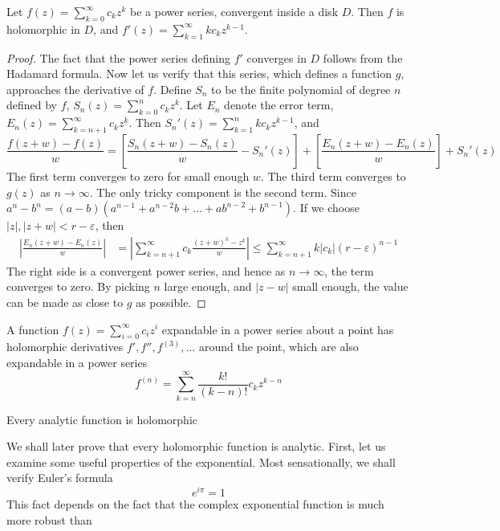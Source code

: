 \begin{theorem}
    Let $f(z) = \sum_{k = 0}^\infty c_k z^k$ be a power series, convergent inside a disk $D$. Then $f$ is holomorphic in $D$, and $f'(z) = \sum_{k = 1}^\infty k c_k z^{k-1}$.
\end{theorem}
\begin{proof}
    The fact that the power series defining $f'$ converges in $D$ follows from the Hadamard formula. Now let us verify that this series, which defines a function $g$, approaches the derivative of $f$. Define $S_n$ to be the finite polynomial of degree $n$ defined by $f$, $S_n(z) = \sum_{k = 0}^n c_k z^k$. Let $E_n$ denote the error term, $E_n(z) = \sum_{k = n+1}^\infty c_k z^k$. Then $S_n'(z) = \sum_{k = 1}^n k c_k z^{k-1}$, and
    \[ \frac{f(z + w) - f(z)}{w} = \left[ \frac{S_n(z + w) - S_n(z)}{w} - S_n'(z) \right] + \left[ \frac{E_n(z + w) - E_n(z)}{w} \right] + S_n'(z) \]
    The first term converges to zero for small enough $w$. The third term converges to $g(z)$ as $n \to \infty$. The only tricky component is the second term. Since $a^n - b^n = (a - b)(a^{n-1} + a^{n-2}b + \dots + ab^{n-2} + b^{n-1})$. If we choose $|z|, |z + w| < r - \varepsilon$, then
    \begin{align*}
        \left| \frac{E_n(z + w) - E_n(z)}{w} \right| &= \left| \sum_{k = n + 1}^\infty c_k \frac{(z + w)^k - z^k}{w} \right| \leq \sum_{k = n + 1}^\infty k |c_k| (r - \varepsilon)^{n-1}
    \end{align*}
    The right side is a convergent power series, and hence as $n \to \infty$, the term converges to zero. By picking $n$ large enough, and $|z - w|$ small enough, the value can be made as close to $g$ as possible.
\end{proof}

\begin{corollary}
    A function $f(z) = \sum_{i = 0}^\infty c_i z^i$ expandable in a power series about a point has holomorphic derivatives $f', f'', f^{(3)}, \dots$ around the point, which are also expandable in a power series
    \[ f^{(n)} = \sum_{k = n}^\infty \frac{k!}{(k - n)!} c_k z^{k-n} \]
\end{corollary}

\begin{corollary}
    Every analytic function is holomorphic
\end{corollary}

We shall later prove that every holomorphic function is analytic. First, let us examine some useful properties of the exponential. Most sensationally, we shall verify Euler's formula
%
\[ e^{i \pi} = 1 \]
%
This fact depends on the fact that the complex exponential function is much more robust than 



